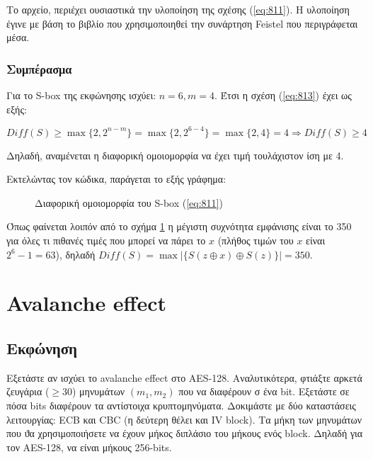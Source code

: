 \documentclass[oneside]{article}
\begin{document}
Το αρχείο, περιέχει ουσιαστικά την υλοποίηση της σχέσης (\ref{eq:811}). Η υλοποίηση έγινε με βάση το βιβλίο \cite{draz} που χρησιμοποιηθεί την συνάρτηση Feistel που περιγράφεται μέσα.

\subsubsection{Συμπέρασμα}

Για το S-box της εκφώνησης ισχύει: $n = 6, m = 4$. Έτσι η σχέση (\ref{eq:813}) έχει ως εξής: 

\begin{equation}
    Diff(S) \ge \max \{2, 2^{n-m}\} = \max \{2, 2^{6-4}\} = \max \{2, 4\} = 4 \Rightarrow Diff(S) \ge 4
\end{equation}

Δηλαδή, αναμένεται η διαφορική ομοιομορφία να έχει τιμή τουλάχιστον ίση με 4.

Εκτελώντας τον κώδικα, παράγεται το εξής γράφημα:

\begin{figure}[H]
    \begin{center}
        \scalebox{0.6}{}
    \end{center}
    \caption{Διαφορική ομοιομορφία του S-box (\ref{eq:811})}
    \label{fig:81}
\end{figure}

Όπως φαίνεται λοιπόν από το σχήμα \ref{fig:81} η μέγιστη συχνότητα εμφάνισης είναι το 350 για όλες τι πιθανές τιμές που μπορεί να πάρει το $x$ (πλήθος τιμών του $x$ είναι $2^6 - 1 = 63$), δηλαδή $Diff(S) = \max |\{S(z \oplus x) \oplus S(z)\}| = 350$.

\section{Avalanche effect}

\subsection{Εκφώνηση}

Εξετάστε αν ισχύει το avalanche effect στο AES-128. Αναλυτικότερα, φτιάξτε αρκετά ζευγάρια ($\ge 30$) μηνυμάτων $(m_1, m_2)$ που να διαφέρουν σ ένα bit. Εξετάστε σε πόσα bits διαφέρουν τα αντίστοιχα κρυπτομηνύματα. Δοκιμάστε με δύο καταστάσεις λειτουργίας: ECB και CBC (η δεύτερη θέλει και IV block). Τα μήκη των μηνυμάτων που ϑα χρησιμοποιήσετε να έχουν μήκος διπλάσιο του μήκους ενός block. Δηλαδή για τον AES-128, να είναι μήκους 256-bits.
\end{document}
